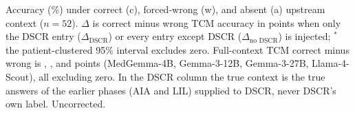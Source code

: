 \documentclass[11pt]{article}
\begin{document}
\begin{table}[t]
\centering
\footnotesize
\setlength{\tabcolsep}{2pt}

\caption{Accuracy (\%) under correct (c), forced-wrong (w), and absent (a) upstream context ($n=52$). $\Delta$ is correct minus wrong TCM accuracy in points when only the DSCR entry ($\Delta_{\text{DSCR}}$) or every entry except DSCR ($\Delta_{\text{no DSCR}}$) is injected; $^{*}$ the patient-clustered 95\% interval excludes zero. Full-context TCM correct minus wrong is \vthreeTcmGapMedGemma{}, \vthreeTcmGapGemmaTwelve{}, \vthreeTcmGapGemmaTwentySeven{} and \vthreeTcmGapScout{} points (MedGemma-4B, Gemma-3-12B, Gemma-3-27B, Llama-4-Scout), all excluding zero. In the DSCR column the true context is the true answers of the earlier phases (AIA and LIL) supplied to DSCR, never DSCR\textquoteright s own label. Uncorrected.}
\label{tab:gating}
\end{table}
\end{document}
